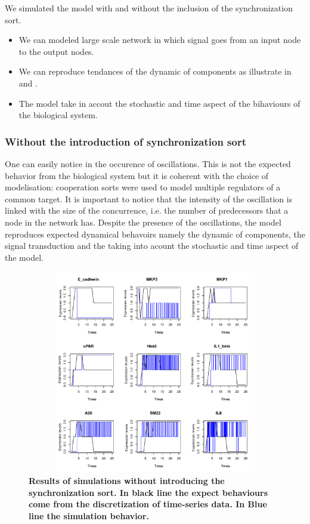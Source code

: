 We simulated the model with and without the inclusion of the synchronization sort.
\begin{itemize}
 \item We can modeled large scale network in which signal goes from an input node to the output nodes.
 \item We can reproduce tendances of the dynamic of components as illustrate in  and .
 \item The model take in accout the stochastic and time aspect of the bihaviours of the biological system.
\end{itemize}


\subsubsection{Without the introduction of synchronization sort}
One can easily notice in  the occurence of oscillations. This is not the expected behavior from the biological system
but it is coherent with the choice of modelisation: cooperation sorts were used to model multiple regulators of a common target. 
It is important to notice that the intensity of the oscillation is linked with 
the size of the concurrence, i.e. the number of predecessors that a node in the network has.
Despite the presence of the oscillations, the model reproduces expected dynamical behavoirs  namely
the dynamic of components, the signal transduction and the taking into acount the stochastic and time aspect of the model.

\begin{figure}[!t]
\centering
\includegraphics[width=6.5in,height=3.5in]{images/resultWOS.pdf}
\caption{\bf Results of simulations without introducing the synchronization sort. In black line the expect behaviours
come from the discretization of time-series data. In Blue line the simulation behavior.}
\label{fig:rwos}
\end{figure}
